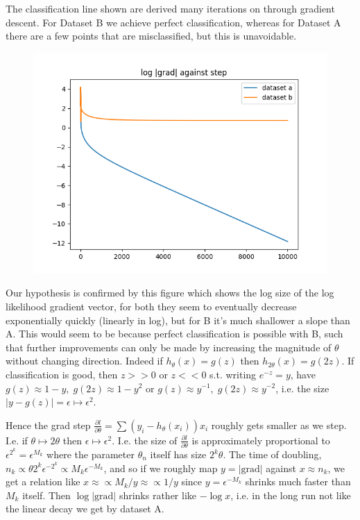 \begin{answer}
The classification line shown are derived many iterations on through gradient descent. For Dataset B we achieve perfect classification, whereas for Dataset A there are a few points that are misclassified, but this is unavoidable. 


\begin{figure}[H]
	\includegraphics{../src/stability/outputs/log_grad_size.png}
\end{figure}

Our hypothesis is confirmed by this figure which shows the log size of the log likelihood gradient vector, for both they seem to eventually decrease exponentially quickly (linearly in log), but for B it's much shallower a slope than A. This would seem to be because perfect classification is possible with B, such that further improvements can only be made by increasing the magnitude of $\theta$ without changing direction. Indeed if $h_\theta(x) = g(z)$ then $h_{2 \theta}(x) = g(2z)$. If classification is good, then $z >> 0$ or $z << 0$ s.t. writing $e^{-z}=y$, have $g(z) \approx 1-y,\; g(2z) \approx 1 - y^2$ or $g(z) \approx y^{-1},\; g(2z) \approx y^{-2}$, i.e. the size $|y - g(z)|=\epsilon \mapsto \epsilon^2$.

Hence the grad step $\frac{\partial l}{\partial \theta} = \sum (y_i - h_\theta(x_i)) x_i$ roughly gets smaller as we step. I.e. if $\theta \mapsto 2\theta$ then $\epsilon \mapsto \epsilon^2$. I.e. the size of $\frac{\partial l}{\partial \theta}$ is approximately proportional to $\epsilon^{2^k} = \epsilon^{M_k}$ where the parameter $\theta_n$ itself has size $2^k \theta$. The time of doubling, $n_k \propto \theta 2^k \epsilon^{-2^k} \propto M_k \epsilon^{-M_k}$, and so if we roughly map $y = |\text{grad}|$ against $x \approx n_k$, we get a relation like $x \approx \propto M_k/y \approx \propto 1/y$ since $y = \epsilon^{-M_k}$ shrinks much faster than $M_k$ itself. Then $\log | \text{grad} |$ shrinks rather like $- \log x$, i.e. in the long run not like the linear decay we get by dataset A.


\end{answer}
